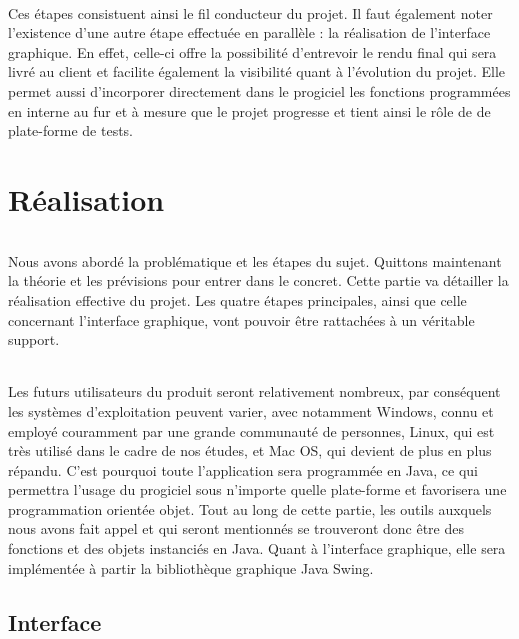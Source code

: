 \documentclass[a4paper,10pt]{report}
\begin{document}
	\paragraph{}
	  Ces étapes consistuent ainsi le fil conducteur du projet. 
	  Il faut également noter l'existence d'une autre étape effectuée en parallèle : la réalisation de l'interface graphique.
	  En effet, celle-ci offre la possibilité d'entrevoir le rendu final qui sera livré au client et facilite également la visibilité quant à l'évolution du projet.
	  Elle permet aussi d'incorporer directement dans le progiciel les fonctions programmées en interne au fur et à mesure que le projet progresse et tient ainsi le rôle de de plate-forme de tests.   
	
\part{Réalisation}
  \setcounter{chapter}{0}
  
	\paragraph{}
	  Nous avons abordé la problématique et les étapes du sujet.
	  Quittons maintenant la théorie et les prévisions pour entrer dans le concret.
	  Cette partie va détailler la réalisation effective du projet.
	  Les quatre étapes principales, ainsi que celle concernant l'interface graphique, vont pouvoir être rattachées à un véritable support.
	  
	\paragraph{}
	  Les futurs utilisateurs du produit seront relativement nombreux, par conséquent les systèmes d'exploitation peuvent varier, avec notamment Windows, connu et employé couramment par une grande communauté de personnes, Linux, qui est très utilisé dans le cadre de nos études, et Mac OS, qui devient de plus en plus répandu.
	  C'est pourquoi toute l'application sera programmée en Java, ce qui permettra l'usage du progiciel sous n'importe quelle plate-forme et favorisera une programmation orientée objet.
	  Tout au long de cette partie, les outils auxquels nous avons fait appel et qui seront mentionnés se trouveront donc être des fonctions et des objets instanciés en Java.
	  Quant à l'interface graphique, elle sera implémentée à partir la bibliothèque graphique Java Swing.
  
  
  \chapter{Interface}	%
\end{document}
